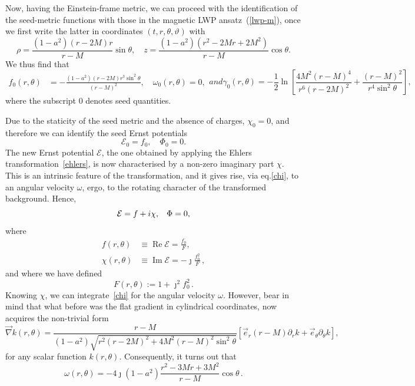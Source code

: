 \documentclass[aps,preprint,groupedaddress,nofootinbib,superscriptaddress,showkeys,showpacs,eqsecnum,amsmath,amssymb]{revtex4-1}
\newcommand{\ernst}{\mathcal{E}}
\renewcommand\Re{\operatorname{Re}}
\renewcommand\Im{\operatorname{Im}}
\begin{document}
Now, having the Einstein-frame metric, we can proceed with the identification of the seed-metric functions with those in the magnetic LWP ansatz~(\ref{lwp-m}), once we first write the latter in coordinates $(t,r,\theta,\vartheta)$ with 
\begin{equation}
    \rho = \frac{(1-a^2)(r-2M)r}{r-M}\sin\theta,\quad z=\frac{(1-a^2)(r^2-2M r + 2M^2)}{r-M}\cos\theta.
\end{equation}
We thus find that
\begin{subequations}\label{seedmetricLWP}
\begin{align}
f_0(r,\theta) &= -\frac{(1-a^2)(r-2M)r^3\sin^2\theta}{(r-M)^2}, \quad
\omega_0(r,\theta) = 0,
\end{align} 
and 
\begin{equation}
    \gamma_0(r,\theta)=-\frac{1}{2}\ln\left[ \frac{4M^2(r-M)^4}{r^6(r-2M)^2} + \frac{(r-M)^2}{r^4\sin^2\theta} \right],
\end{equation}
\end{subequations}
where the subscript $0$ denotes seed quantities. 


Due to the staticity of the seed metric and the absence of charges, $\chi_0=0$, and therefore we can identify 
the seed Ernst potentials
\begin{equation}
\ernst_0=f_0, \quad \Phi_0=0.
\end{equation}
The new Ernst potential $\ernst$, the one obtained by applying the Ehlers transformation~\eqref{ehlers}, is now characterised by a non-zero imaginary part $\chi$. This is an intrinsic feature of the transformation, and it gives rise, via eq.\eqref{chi}, to an angular velocity $\omega$, ergo, to the rotating character of the transformed background. 
Hence, 
\begin{equation}
\ernst=f+i\chi, \hspace{0.3cm} \Phi=0,
\end{equation}
where 
\begin{subequations}
\begin{align}
f(r,\theta) &\equiv \Re \ernst= \frac{f_0}{F}, \\
\chi(r,\theta) &\equiv \Im\ernst= -\jmath \frac{f_0^2}{F} \, , 
\end{align}
\end{subequations}
and where we have defined 
\begin{equation}
F(r,\theta) := 1 + \jmath^2 f_0^2 \,.
\end{equation}
Knowing $\chi$, we can integrate~\eqref{chi} for the angular velocity $\omega$. However, bear in mind that what before was the flat gradient in cylindrical coordinates, now acquires the non-trivial form
\begin{equation}
    \vec{\nabla} k(r,\theta) = \frac{r-M}{(1-a^2)\sqrt{r^2(r-2M)^2 + 4M^2(r-M)^2\sin^2\theta}}\left[\vec{e}_r(r-M)\partial_r k + \vec{e}_\theta\partial_\theta k\right],
\end{equation}
for any scalar function $k(r,\theta)$. Consequently, it turns out that
\begin{equation}
\omega(r,\theta) = -4\jmath (1-a^2) \frac{r^2-3Mr+3M^2}{r-M} \cos\theta \,.\label{eq:omega}
\end{equation}
\end{document}

